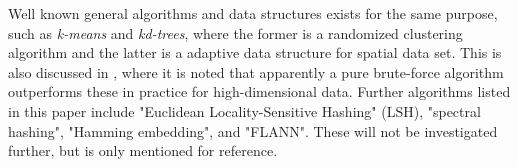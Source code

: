 Well known general algorithms and data structures exists for the same purpose, such as \textit{k-means} and \textit{kd-trees}, where the former is a randomized clustering algorithm and the latter is a adaptive data structure for spatial data set. This is also discussed in \cite{schmid9}, where it is noted that apparently a pure brute-force algorithm outperforms these in practice for high-dimensional data. Further algorithms listed in this paper include "Euclidean Locality-Sensitive Hashing" (LSH), "spectral hashing", "Hamming embedding", and "FLANN". These will not be investigated further, but is only mentioned for reference.

